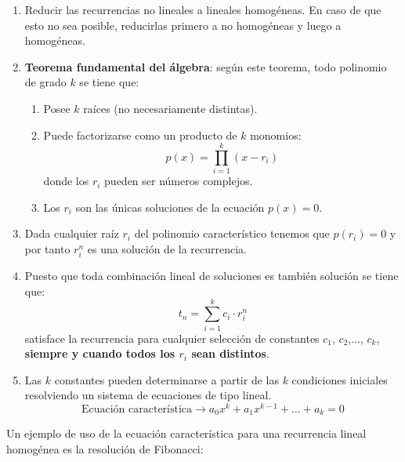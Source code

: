 \documentclass[10pt,a4paper,spanish]{report}
\theoremstyle{definition}
\theoremstyle{remark}
\begin{document}
\begin{enumerate}[$\spadesuit$]
    \item Reducir las recurrencias no lineales a lineales homogéneas. En caso de que esto no sea posible, reducirlas primero a no homogéneas y luego a homogéneas.

    \item \textbf{\textcolor{YellowOrange}{Teorema fundamental del álgebra}}: según este teorema, todo polinomio de grado $k$ se tiene que:

        \begin{enumerate}[$\star$]
            \item Posee $k$ raíces (no necesariamente distintas).
            \item Puede factorizarse como un producto de $k$ monomios:
            \begin{displaymath}
                p(x) = \prod_{i = 1}^k(x-r_i)
            \end{displaymath}
            donde los $r_i$ pueden ser números complejos.
            \item Los $r_i$ son las únicas soluciones de la ecuación $p(x) = 0$.
        \end{enumerate}

    \item Dada cualquier raíz $r_i$ del polinomio característico tenemos que $p(r_i) = 0$ y por tanto $r_i^{n}$ es una solución de la recurrencia.

    \item Puesto que toda combinación lineal de soluciones es también solución se tiene que:
    \begin{displaymath}
        t_n = \sum_{i = 1}^k c_i\cdot r_i^n
    \end{displaymath}
    satisface la recurrencia para cualquier selección de constantes $c_1$, $c_2$,$\ldots$, $c_k$, \textbf{siempre y cuando todos los $r_i$ sean distintos}.

    \item Las $k$ constantes pueden determinarse a partir de las $k$ condiciones iniciales resolviendo un sistema de ecuaciones de tipo lineal.
    \begin{displaymath}
        \text{Ecuación característica}\rightarrow a_0x^k + a_1x^{k-1}+\ldots+a_k = 0
    \end{displaymath}
\end{enumerate}

Un ejemplo de uso de la ecuación característica para una recurrencia lineal homogénea es la resolución de Fibonacci:
\label{fibonacci_recursivo}
\end{document}

